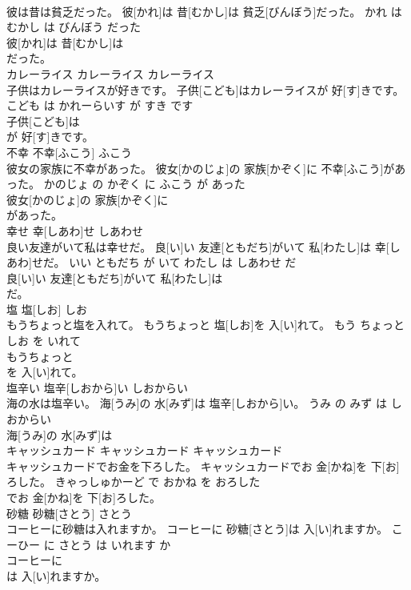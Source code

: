 \documentclass[8pt]{extreport}
\begin{document}
\begin{CJK}{UTF8}{min}
\\	彼は昔は貧乏だった。	彼[かれ]は 昔[むかし]は 貧乏[びんぼう]だった。	かれ は むかし は びんぼう だった	
\\	彼[かれ]は 昔[むかし]は
\\	だった。		
\\	カレーライス	カレーライス	カレーライス	
\\	子供はカレーライスが好きです。	子供[こども]はカレーライスが 好[す]きです。	こども は かれーらいす が すき です	
\\	子供[こども]は
\\	が 好[す]きです。		
\\	不幸	不幸[ふこう]	ふこう	
\\	彼女の家族に不幸があった。	彼女[かのじょ]の 家族[かぞく]に 不幸[ふこう]があった。	かのじょ の かぞく に ふこう が あった	
\\	彼女[かのじょ]の 家族[かぞく]に
\\	があった。		
\\	幸せ	幸[しあわ]せ	しあわせ	
\\	良い友達がいて私は幸せだ。	良[い]い 友達[ともだち]がいて 私[わたし]は 幸[しあわ]せだ。	いい ともだち が いて わたし は しあわせ だ	
\\	良[い]い 友達[ともだち]がいて 私[わたし]は
\\	だ。		
\\	塩	塩[しお]	しお	
\\	もうちょっと塩を入れて。	もうちょっと 塩[しお]を 入[い]れて。	もう ちょっと しお を いれて	
\\	もうちょっと
\\	を 入[い]れて。		
\\	塩辛い	塩辛[しおから]い	しおからい	
\\	海の水は塩辛い。	海[うみ]の 水[みず]は 塩辛[しおから]い。	うみ の みず は しおからい	
\\	海[うみ]の 水[みず]は
\\	キャッシュカード	キャッシュカード	キャッシュカード	
\\	キャッシュカードでお金を下ろした。	キャッシュカードでお 金[かね]を 下[お]ろした。	きゃっしゅかーど で おかね を おろした	
\\	でお 金[かね]を 下[お]ろした。		
\\	砂糖	砂糖[さとう]	さとう	
\\	コーヒーに砂糖は入れますか。	コーヒーに 砂糖[さとう]は 入[い]れますか。	こーひー に さとう は いれます か	
\\	コーヒーに
\\	は 入[い]れますか。		

\end{CJK}
\end{document}

